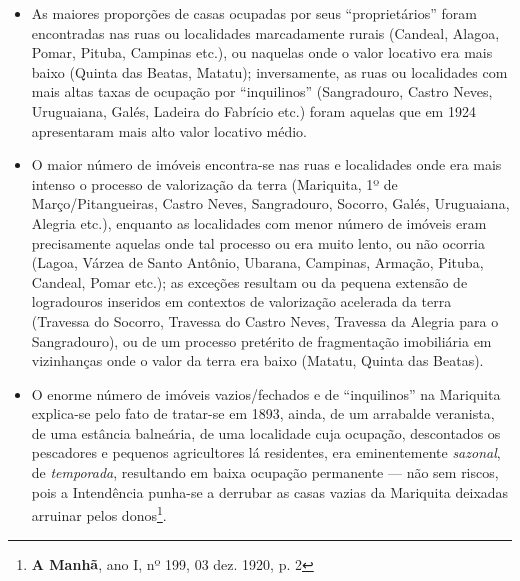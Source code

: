 \begin{itemize}
\item As maiores proporções de casas ocupadas por seus ``proprietários'' foram encontradas nas ruas ou localidades marcadamente rurais (Candeal, Alagoa, Pomar, Pituba, Campinas etc.), ou naquelas onde o valor locativo era mais baixo (Quinta das Beatas, Matatu); inversamente, as ruas ou localidades com mais altas taxas de ocupação por ``inquilinos'' (Sangradouro, Castro Neves, Uruguaiana, Galés, Ladeira do Fabrício etc.) foram aquelas que em 1924 apresentaram mais alto valor locativo médio.
\item O maior número de imóveis encontra-se nas ruas e localidades onde era mais intenso o processo de valorização da terra (Mariquita, 1º de Março/Pitangueiras, Castro Neves, Sangradouro, Socorro, Galés, Uruguaiana, Alegria etc.), enquanto as localidades com menor número de imóveis eram precisamente aquelas onde tal processo ou era muito lento, ou não ocorria (Lagoa, Várzea de Santo Antônio, Ubarana, Campinas, Armação, Pituba, Candeal, Pomar etc.); as exceções resultam ou da pequena extensão de logradouros inseridos em contextos de valorização acelerada da terra (Travessa do Socorro, Travessa do Castro Neves, Travessa da Alegria para o Sangradouro), ou de um processo pretérito de fragmentação imobiliária em vizinhanças onde o valor da terra era baixo (Matatu, Quinta das Beatas).
\item O enorme número de imóveis vazios/fechados e de ``inquilinos'' na Mariquita explica-se pelo fato de tratar-se em 1893, ainda, de um arrabalde veranista, de uma estância balneária, de uma localidade cuja ocupação, descontados os pescadores e pequenos agricultores lá residentes, era eminentemente \textit{sazonal}, de \textit{temporada}, resultando em baixa ocupação permanente --- não sem riscos, pois a Intendência punha-se a derrubar as casas vazias da Mariquita deixadas arruinar pelos donos\footnote{\textbf{A Manhã}, ano I, nº 199, 03 dez. 1920, p. 2}.
\end{itemize}

